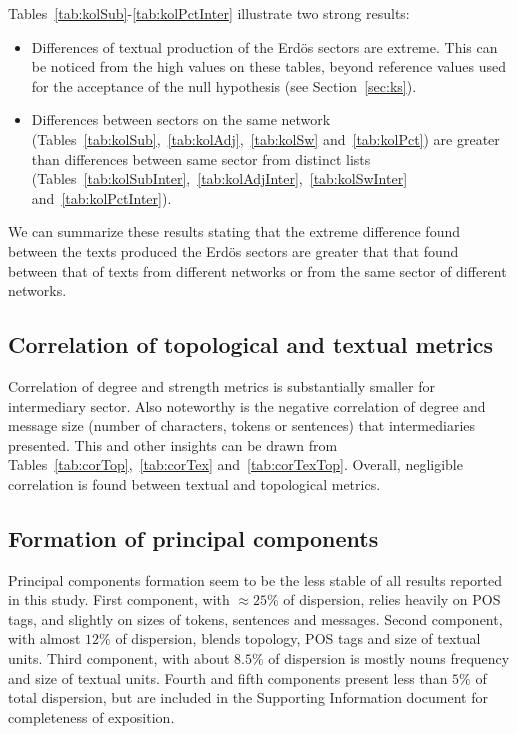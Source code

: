 \documentclass[%
 aip,
 jmp,%
 amsmath,amssymb,
 reprint,%
]{revtex4-1}
\begin{document}
Tables~\ref{tab:kolSub}-\ref{tab:kolPctInter}
illustrate two strong results:
\begin{itemize}
    \item Differences of textual production of the Erd\"os sectors are extreme.
	    This can be noticed from the high values on these tables,
	    beyond reference values used for the acceptance of the 
	    null hypothesis (see Section~\ref{sec:ks}).
    \item Differences between sectors on the same network 
	    (Tables~\ref{tab:kolSub},~\ref{tab:kolAdj},~\ref{tab:kolSw} and~\ref{tab:kolPct}) are greater than differences between same sector from distinct lists (Tables~\ref{tab:kolSubInter},~\ref{tab:kolAdjInter},~\ref{tab:kolSwInter} and~\ref{tab:kolPctInter}).
\end{itemize}

We can summarize these results stating that the extreme difference
found between the texts produced the Erd\"os sectors
are greater that that found between that of texts from different
networks or from the same sector of different networks.

\subsection{Correlation of topological and textual metrics}\label{subsec:cor}
Correlation of degree 
and strength metrics is
substantially smaller for intermediary sector.
Also noteworthy is the negative correlation of degree and message size (number of characters, tokens or sentences) that intermediaries presented.
This and other insights can be drawn from Tables~\ref{tab:corTop},~\ref{tab:corTex} and~\ref{tab:corTexTop}.
Overall, negligible correlation is found between textual and topological metrics.

\subsection{Formation of principal components}\label{subsec:pc}
Principal components formation seem to be the less stable of all results reported in this study.
First component, with $\approx 25\%$ of dispersion, relies heavily on POS tags,
and slightly on sizes of tokens, sentences and messages.
Second component, with almost $12\%$ of dispersion, blends topology, POS tags and size of textual units.
Third component, with about $8.5\%$ of dispersion is mostly nouns frequency and size of textual units.
Fourth and fifth components present less than $5\%$ of total dispersion,
but are included in the Supporting Information document for completeness of exposition.
\end{document}
